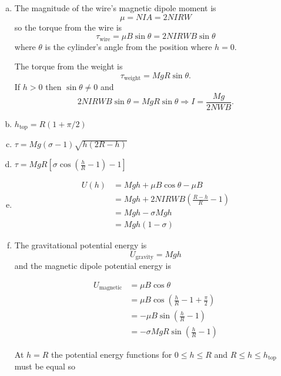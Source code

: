\documentclass{article}
\begin{document}
\begin{enumerate}[(a)]
  \item The magnitude of the wire's magnetic dipole moment is \[\mu = N I A = 2 N I R W\] so the torque from the wire is \[\tau_\textrm{wire} = \mu B \sin \theta = 2 N I R W B \sin \theta\] where $\theta$ is the cylinder's angle from the position where $h = 0$.

        The torque from the weight is \[\tau_\textrm{weight} = M g R \sin \theta.\] If $h > 0$ then $\sin \theta \ne 0$ and \[2 N I R W B \sin \theta = M g R \sin \theta \Rightarrow I = \frac{M g}{2 N W B}.\]

  \item $h_\textrm{top} = R (1 + \pi / 2)$

  \item $\tau = M g (\sigma - 1) \sqrt{h (2 R - h)}$

  \item $\tau = M g R \left[ \sigma \cos \left( \frac{h}{R} - 1 \right) - 1 \right]$

  \item

        \begin{align*}
          U(h) & = M g h + \mu B \cos \theta - \mu B                      \\
               & = M g h + 2 N I R W B \left( \frac{R - h}{R} - 1 \right) \\
               & = M g h - \sigma M g h                                   \\
               & = M g h (1 - \sigma)
        \end{align*}

  \item The gravitational potential energy is \[U_\textrm{gravity} = M g h\] and the magnetic dipole potential energy is

        \begin{align*}
          U_\textrm{magnetic} & = \mu B \cos \theta                                         \\
                              & = \mu B \cos \left( \frac{h}{R} - 1 + \frac{\pi}{2} \right) \\
                              & = -\mu B \sin \left( \frac{h}{R} - 1 \right)                \\
                              & = -\sigma M g R \sin \left( \frac{h}{R} - 1 \right)
        \end{align*}

        At $h = R$ the potential energy functions for $0 \le h \le R$ and $R \le h \le h_\textrm{top}$ must be equal so


\end{enumerate}
\end{document}
